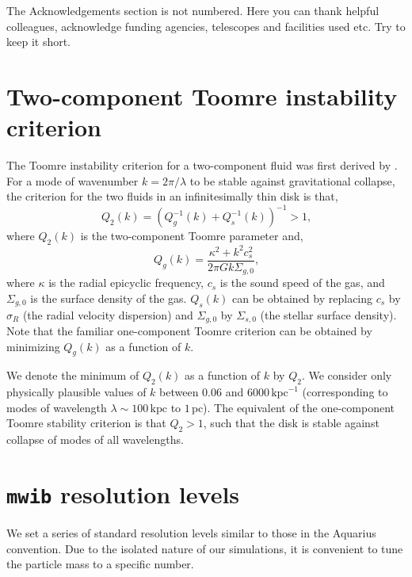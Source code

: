 \documentclass[a4paper,fleqn,usenatbib]{mnras}
\newcommand{\pc}{\ensuremath{\text{pc}}}
\newcommand{\kpc}{\ensuremath{\text{kpc}}}
\newcommand{\beq}{\begin{equation}}
\newcommand{\eeq}{\end{equation}}
\newcommand{\mwib}{\texttt{mwib}}
\begin{document}
The Acknowledgements section is not numbered. Here you can thank helpful
colleagues, acknowledge funding agencies, telescopes and facilities used etc.
Try to keep it short.






\appendix

\section{Two-component Toomre instability criterion}
The Toomre instability criterion for a two-component fluid was first derived
by \citet{1984ApJ...276..114J}. For a mode of wavenumber $k=2\pi/\lambda$ to
be stable against gravitational collapse, the criterion for the two fluids in
an infinitesimally thin disk is that,
\beq
Q_2(k) = \left(Q_g^{-1}(k) + Q_s^{-1}(k) \right)^{-1} > 1\text{,}
\eeq
where $Q_2(k)$ is the two-component Toomre parameter and,
\beq
Q_g(k) = \frac{\kappa^2 + k^2 c_s^2}{2\pi G k \Sigma_{g,0}}\text{,}
\eeq
where $\kappa$ is the radial epicyclic frequency, $c_s$ is the sound speed of
the gas, and $\Sigma_{g,0}$ is the surface density of the gas. $Q_s(k)$ can be
obtained by replacing $c_s$ by $\sigma_R$ (the radial velocity dispersion) and
$\Sigma_{g,0}$ by $\Sigma_{s,0}$ (the stellar surface density). Note that the
familiar one-component Toomre criterion can be obtained by minimizing $Q_g(k)$
as a function of $k$.

We denote the minimum of $Q_2(k)$ as a function of $k$ by $Q_2$. We consider
only physically plausible values of $k$ between $0.06$ and $6000\,\kpc^{-1}$
(corresponding to modes of wavelength $\lambda\sim100\,\kpc$ to $1\,\pc$). The
equivalent of the one-component Toomre stability criterion is that $Q_2>1$,
such that the disk is stable against collapse of modes of all wavelengths.

\section{\mwib{} resolution levels}
We set a series of standard resolution levels similar to those in the Aquarius
convention. Due to the isolated nature of our simulations, it is convenient to
tune the particle mass to a specific number.
\end{document}
